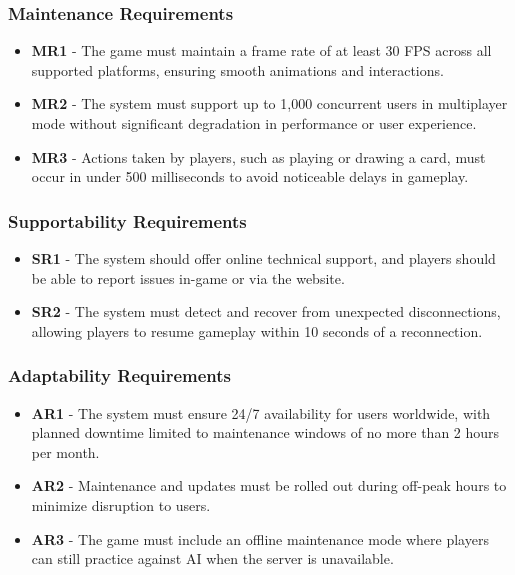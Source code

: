 \documentclass[12pt, titlepage]{article}
\begin{document}
\subsubsection{Maintenance Requirements}
\begin{itemize}
    \item \textbf{MR1} - The game must maintain a frame rate of at least 30 FPS across all supported platforms, ensuring smooth animations and interactions.
    \item \textbf{MR2} - The system must support up to 1,000 concurrent users in multiplayer mode without significant degradation in performance or user experience.
    \item \textbf{MR3} - Actions taken by players, such as playing or drawing a card, must occur in under 500 milliseconds to avoid noticeable delays in gameplay.
\end{itemize}

\subsubsection{Supportability Requirements}
\begin{itemize}
    \item \textbf{SR1} - The system should offer online technical support, and players should be able to report issues in-game or via the website.
    \item \textbf{SR2} - The system must detect and recover from unexpected disconnections, allowing players to resume gameplay within 10 seconds of a reconnection.
\end{itemize}

\subsubsection{Adaptability Requirements}
\begin{itemize}
    \item \textbf{AR1} - The system must ensure 24/7 availability for users worldwide, with planned downtime limited to maintenance windows of no more than 2 hours per month.
    \item \textbf{AR2} - Maintenance and updates must be rolled out during off-peak hours to minimize disruption to users.
    \item \textbf{AR3} - The game must include an offline maintenance mode where players can still practice against AI when the server is unavailable.
\end{itemize}
\end{document}
